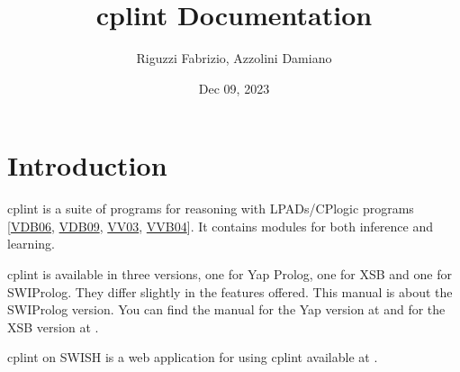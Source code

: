 \documentclass[letterpaper,10pt,english]{sphinxmanual}
\title{cplint Documentation}
\date{Dec 09, 2023}
\author{Riguzzi Fabrizio, Azzolini Damiano}
\begin{document}
\pagestyle{empty}
\sphinxmaketitle
\pagestyle{plain}
\sphinxtableofcontents
\pagestyle{normal}
\label{\detokenize{index::doc}}



\chapter{Introduction}
\label{\detokenize{index:introduction}}
\sphinxAtStartPar
cplint is a suite of programs for reasoning with LPADs/CP\sphinxhyphen{}logic programs {[}\hyperlink{cite.index:id66}{VDB06}, \hyperlink{cite.index:id67}{VDB09}, \hyperlink{cite.index:id65}{VV03}, \hyperlink{cite.index:id45}{VVB04}{]}.
It contains modules for both inference and learning.

\sphinxAtStartPar
cplint is available in three versions, one for Yap Prolog, one for XSB and one for SWI\sphinxhyphen{}Prolog.
They differ slightly in the features offered.
This manual is about the SWI\sphinxhyphen{}Prolog version.
You can find the manual for the Yap version at  and
for the XSB version at .

\sphinxAtStartPar
cplint on SWISH is a web application for using cplint available at .
\end{document}
